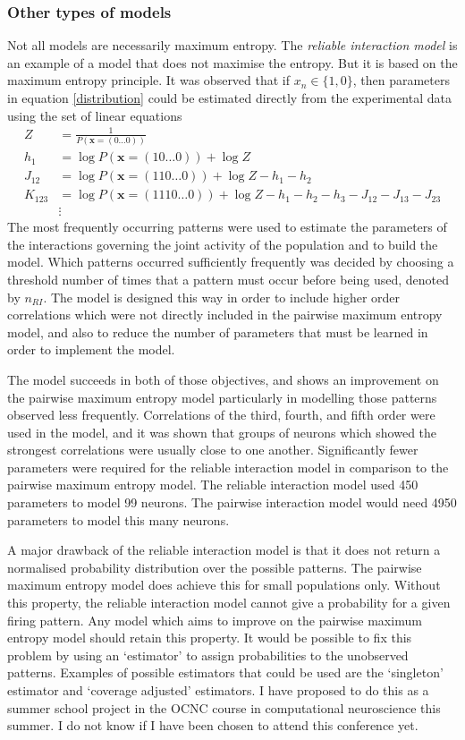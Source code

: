 \documentclass[a4paper,12pt]{article}
\theoremstyle{definition}
\begin{document}
\subsubsection{Other types of models}
	Not all models are necessarily maximum entropy. The \textit{reliable interaction model} \cite{ganmor} is an example of a model that does not maximise the entropy. But it is based on the maximum entropy principle. It was observed that if $x_n \in \lbrace 1, 0 \rbrace$, then parameters in equation \ref{distribution} could be estimated directly from the experimental data using the set of linear equations
	\begin{align*}
	Z &= \frac{1}{P(\mathbf{x} = (0\dots0))} \\
	h_1 &= \log P(\mathbf{x} = (10\dots0)) + \log Z	\\
	J_{12} &= \log P(\mathbf{x} = (110\dots0)) + \log Z - h_1 - h_2 \\
	K_{123} &= \log P(\mathbf{x} = (1110\dots0)) + \log Z - h_1 - h_2 - h_3 - J_{12} - J_{13}- J_{23} \\
	 &\vdots
	\end{align*}
	The most frequently occurring patterns were used to estimate the parameters of the interactions governing the joint activity of the population and to build the model. Which patterns occurred sufficiently frequently was decided by choosing a threshold number of times that a pattern must occur before being used, denoted by $n_{RI}$. The model is designed this way in order to include higher order correlations which were not directly included in the pairwise maximum entropy model, and also to reduce the number of parameters that must be learned in order to implement the model. 
	
	The model succeeds in both of those objectives, and shows an improvement on the pairwise maximum entropy model particularly in modelling those patterns observed less frequently. Correlations of the third, fourth, and fifth order were used in the model, and it was shown that groups of neurons which showed the strongest correlations were usually close to one another. Significantly fewer parameters were required for the reliable interaction model in comparison to the pairwise maximum entropy model. The reliable interaction model used 450 parameters to model 99 neurons. The pairwise interaction model would need 4950 parameters to model this many neurons. 
	
	A major drawback of the reliable interaction model is that it does not return a normalised probability distribution over the possible patterns. The pairwise maximum entropy model does achieve this for small populations only. Without this property, the reliable interaction model cannot give a probability for a given firing pattern. Any model which aims to improve on the pairwise maximum entropy model should retain this property. It would be possible to fix this problem by using an `estimator' to assign probabilities to the unobserved patterns. Examples of possible estimators that could be used are the `singleton' estimator and `coverage adjusted' estimators. I have proposed to do this as a summer school project in the OCNC course in computational neuroscience this summer. I do not know if I have been chosen to attend this conference yet. 
	
\end{document}
